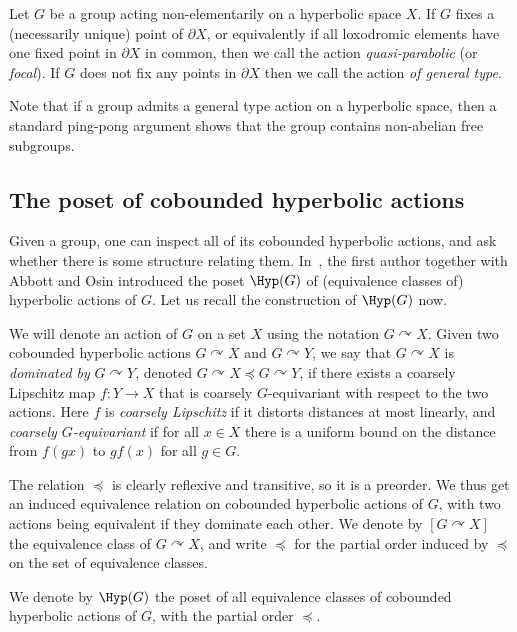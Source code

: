 \begin{defi}
Let $G$ be a group acting non-elementarily on a hyperbolic space $X$. If $G$ fixes a (necessarily unique) point of $\partial X$, or equivalently if all loxodromic elements have one fixed point in $\partial X$ in common, then we call the action \emph{quasi-parabolic} (or \emph{focal}). If $G$ does not fix any points in $\partial X$ then we call the action \emph{of general type}.
\end{defi}

Note that if a group admits a general type action on a hyperbolic space, then a standard ping-pong argument shows that the group contains non-abelian free subgroups.


\subsection{The poset of cobounded hyperbolic actions}\label{ssec:poset}

Given a group, one can inspect all of its cobounded hyperbolic actions, and ask whether there is some structure relating them. In~\cite{ABO}, the first author together with Abbott and Osin introduced the poset $\Hyp(G)$ of (equivalence classes of) hyperbolic actions of $G$. Let us recall the construction of $\Hyp(G)$ now.

We will denote an action of $G$ on a set $X$ using the notation $G \curvearrowright X$. Given two cobounded hyperbolic actions $G\curvearrowright X$ and $G\curvearrowright Y$, we say that $G\curvearrowright X$ is \emph{dominated by} $G\curvearrowright Y$, denoted $G\curvearrowright X \preceq G\curvearrowright Y$, if there exists a coarsely Lipschitz map $f\colon Y\to X$ that is coarsely $G$-equivariant with respect to the two actions. Here $f$ is \emph{coarsely Lipschitz} if it distorts distances at most linearly, and \emph{coarsely $G$-equivariant} if for all $x\in X$ there is a uniform bound on the distance from $f(gx)$ to $gf(x)$ for all $g\in G$.

The relation $\preceq$ is clearly reflexive and transitive, so it is a preorder. We thus get an induced equivalence relation on cobounded hyperbolic actions of $G$, with two actions being equivalent if they dominate each other. We denote by $[G\curvearrowright X]$ the equivalence class of $G\curvearrowright X$, and write $\preccurlyeq$ for the partial order induced by $\preceq$ on the set of equivalence classes.

\begin{defi}
We denote by $\Hyp(G)$ the poset of all equivalence classes of cobounded hyperbolic actions of $G$, with the partial order $\preccurlyeq$.
\end{defi}

